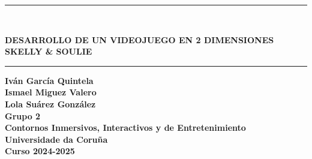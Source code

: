 \documentclass[12pt,a4paper,twoside,spanish]{article}      %
\begin{document}
\def\chaptername{Capítulo}
\def\tablename{Tabla}
\def\listtablename{Índice de Tablas}
\chapterfont{\LARGE\raggedleft}

\pagestyle{empty}

\begin{titlepage}
\setlength{\parindent}{0cm} \setlength{\parskip}{0cm}


\newcommand{\HRule}{\rule{\linewidth}{1mm}}

\vspace*{2cm}
\HRule \\[0.5cm]
\begin{center}
\textsf{\textbf{\large DESARROLLO DE UN VIDEOJUEGO EN 2 DIMENSIONES\\[0.75cm] SKELLY \& SOULIE \\[0.5cm]}}
\HRule \vspace*{3cm}

\textsf{\textbf{\normalsize Iván García Quintela\\ Ismael Miguez Valero\\ Lola Suárez González\\[5cm]
Grupo 2\\
Contornos Inmersivos, Interactivos y de Entretenimiento\\
Universidade da Coruña \\ 
Curso
2024-2025}}
\end{center}
\end{titlepage}

\cleardoublepage


\tableofcontents
\cleardoublepage



 \pagestyle{myheadings} 
\end{document}
